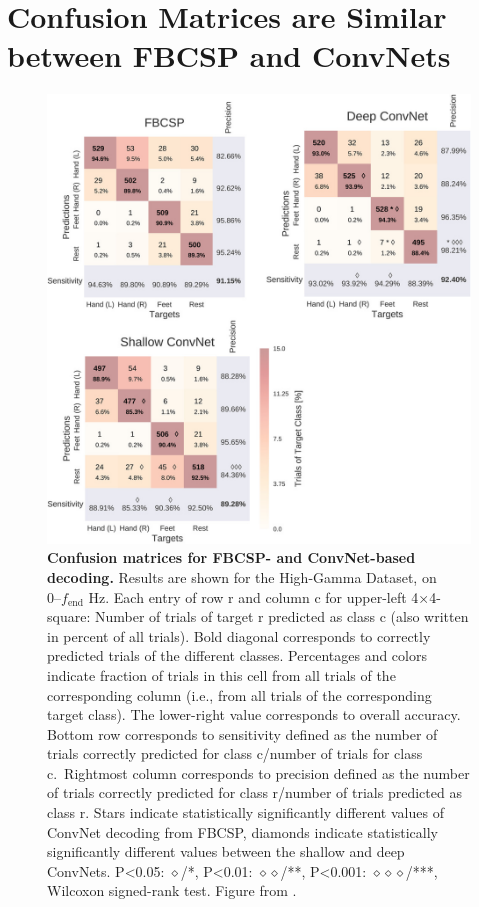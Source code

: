 \section{Confusion Matrices are Similar between FBCSP and
ConvNets}\label{confusion-matrices-are-similar-between-fbcsp-and-convnets}


\begin{figure}[htb]
    \myfloatalign
    \includegraphics[width=1\linewidth]{images/Confusion_Mats.jpg}
    \caption[Confusion matrices for FBCSP- and ConvNet-based decoding]{
\textbf{Confusion matrices for FBCSP- and ConvNet-based decoding.}
Results are shown for the High-Gamma Dataset, on $0–f_\textrm{end}$
Hz. Each entry of row r and column c for upper-left 4×4-square: Number
of trials of target r predicted as class c (also written in percent of
all trials). Bold diagonal corresponds to correctly predicted trials of
the different classes. Percentages and colors indicate fraction of
trials in this cell from all trials of the corresponding column (i.e.,
from all trials of the corresponding target class). The lower-right
value corresponds to overall accuracy. Bottom row corresponds to
sensitivity defined as the number of trials correctly predicted for
class c/number of trials for class c.~Rightmost column corresponds to
precision defined as the number of trials correctly predicted for class
r/number of trials predicted as class r. Stars indicate statistically
significantly different values of ConvNet decoding from FBCSP, diamonds
indicate statistically significantly different values between the
shallow and deep ConvNets. P\textless0.05: $\diamond$/*,
P\textless0.01: $\diamond\diamond$/**, P\textless0.001:
$\diamond\diamond\diamond$/***, Wilcoxon signed-rank test. Figure from
\citet{schirrmeisterdeephbm2017}.
}
\label{confusion-mat-figure}
\end{figure}



